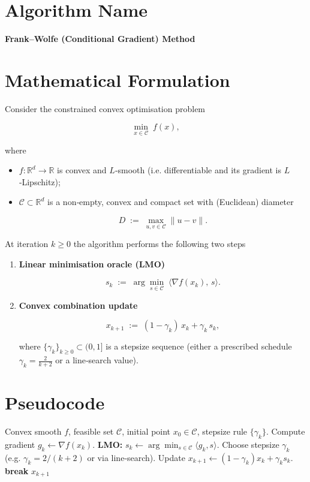 \documentclass{article}
\begin{document}
\section*{Algorithm Name}
\textbf{Frank–Wolfe (Conditional Gradient) Method}

\section*{Mathematical Formulation}
Consider the constrained convex optimisation problem  

\[
\min_{x\in\mathcal C}\; f(x),
\tag{P}
\]

where  

\begin{itemize}
\item $f:\mathbb R^{d}\rightarrow\mathbb R$ is convex and $L$‑smooth (i.e. differentiable and its gradient is $L$‑Lipschitz);
\item $\mathcal C\subset\mathbb R^{d}$ is a non‑empty, convex and compact set with (Euclidean) diameter  

\[
D \;:=\; \max_{u,v\in\mathcal C}\|u-v\| .
\]
\end{itemize}

At iteration $k\ge 0$ the algorithm performs the following two steps  

\begin{enumerate}
\item \textbf{Linear minimisation oracle (LMO)}  

\[
s_k \;:=\; \arg\min_{s\in\mathcal C}\;\langle \nabla f(x_k),\,s\rangle .
\tag{1}
\]

\item \textbf{Convex combination update}  

\[
x_{k+1}\;:=\;(1-\gamma_k)\,x_k+\gamma_k\,s_k ,
\tag{2}
\]

where $\{\gamma_k\}_{k\ge0}\subset(0,1]$ is a stepsize sequence (either a prescribed schedule
$\gamma_k =\frac{2}{k+2}$ or a line‑search value).  
\end{enumerate}

\section*{Pseudocode}
\begin{algorithm}[H]
\caption{Frank–Wolfe (Conditional Gradient)}\label{alg:FW}
\begin{algorithmic}[1]
\REQUIRE Convex smooth $f$, feasible set $\mathcal C$, initial point $x_0\in\mathcal C$, stepsize rule $\{\gamma_k\}$.
    \STATE Compute gradient $g_k \gets \nabla f(x_k)$.
    \STATE \textbf{LMO:} $s_k \gets \arg\min_{s\in\mathcal C}\langle g_k,s\rangle$.
    \STATE Choose stepsize $\gamma_k$ (e.g. $\gamma_k=2/(k+2)$ or via line‑search).
    \STATE Update $x_{k+1}\gets (1-\gamma_k)x_k+\gamma_k s_k$.
        \STATE \textbf{break}
    \ENDIF
\ENDFOR
\RETURN $x_{k+1}$
\end{algorithmic}
\end{algorithm}
\end{document}
